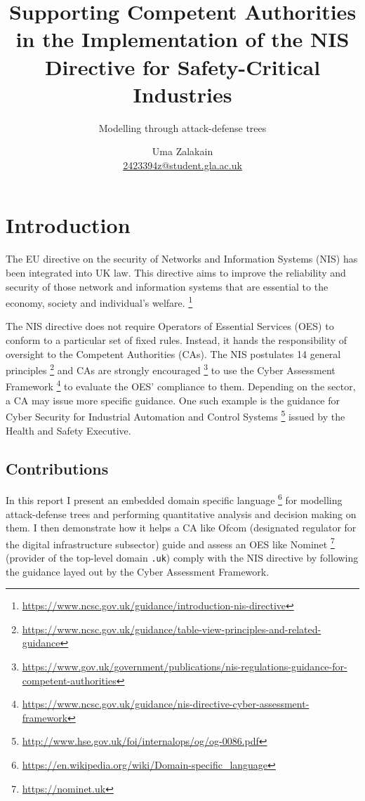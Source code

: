 \documentclass{scrreprt}
\begin{document}
\title{Supporting Competent Authorities in the Implementation of the NIS
Directive for Safety-Critical Industries}
\subtitle{Modelling through attack-defense trees}
\author{Uma Zalakain \\ \href{mailto:2423394z@student.gla.ac.uk}{2423394z@student.gla.ac.uk}}

{\let\newpage\relax\maketitle}
\doclicenseThis
\newpage

\setcounter{tocdepth}{2}
\tableofcontents
\newpage
{}

\chapter{Introduction}

The EU directive on the security of Networks and Information Systems (NIS) has
been integrated into UK law. This directive aims to improve the reliability and
security of those network and information systems that are essential to the
economy, society and individual's welfare.
\footnote{\url{https://www.ncsc.gov.uk/guidance/introduction-nis-directive}}

The NIS directive does not require Operators of Essential Services (OES) to
conform to a particular set of fixed rules. Instead, it hands the responsibility
of oversight to the Competent Authorities (CAs). The NIS postulates 14 general
principles
\footnote{\url{https://www.ncsc.gov.uk/guidance/table-view-principles-and-related-guidance}}
and CAs are strongly encouraged
\footnote{\url{https://www.gov.uk/government/publications/nis-regulations-guidance-for-competent-authorities}}
to use the Cyber Assessment Framework
\footnote{\url{https://www.ncsc.gov.uk/guidance/nis-directive-cyber-assessment-framework}}
to evaluate the OES' compliance to them. Depending on the sector, a CA may issue
more specific guidance. One such example is the guidance for Cyber Security for
Industrial Automation and Control Systems
\footnote{\url{http://www.hse.gov.uk/foi/internalops/og/og-0086.pdf}} issued by
the Health and Safety Executive.

\section{Contributions}

In this report I present an embedded domain specific language
\footnote{\url{https://en.wikipedia.org/wiki/Domain-specific_language}} for
modelling attack-defense trees \cite{Kordy} and performing quantitative analysis
and decision making on them. I then demonstrate how it helps a CA like Ofcom
(designated regulator for the digital infrastructure subsector) guide and assess
an OES like Nominet \footnote{\url{https://nominet.uk}} (provider of the
top-level domain \texttt{.uk}) comply with the NIS directive by following the
guidance layed out by the Cyber Assessment Framework.
\end{document}
